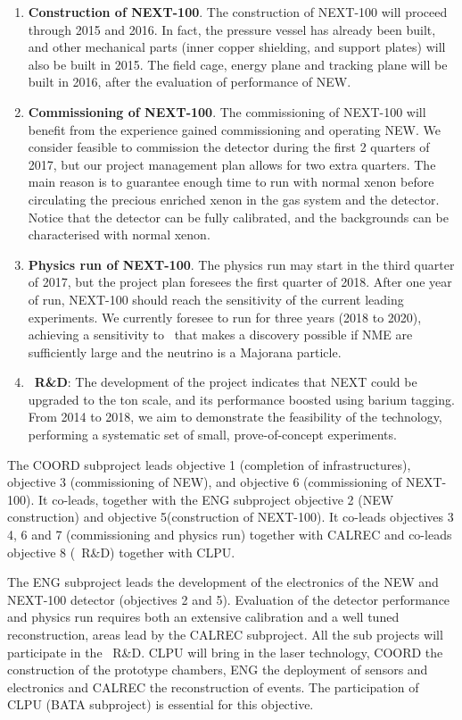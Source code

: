 \begin{enumerate}
\item {\bf Construction of NEXT-100}. The construction of NEXT-100 will proceed through 2015 and 2016. In fact, the pressure vessel has already been built, and other mechanical parts (inner copper shielding, and support plates) will also be built in 2015. The field cage, energy plane and tracking plane will be built in 2016, after the evaluation of performance of NEW. 

\item {\bf Commissioning of NEXT-100}. The commissioning of NEXT-100 will benefit from the experience gained commissioning and operating NEW. We consider feasible to commission the detector during the first 2 quarters of 2017, but our project management plan allows for two extra quarters. The main reason is to guarantee enough time to run with normal xenon before circulating the precious enriched xenon in the gas system and the detector. Notice that the detector can be fully calibrated, and the backgrounds can be characterised with normal xenon.  

\item {\bf Physics run of NEXT-100}. The physics run may start in the third quarter of 2017, but the project plan foresees the first quarter of 2018. After one year of run, NEXT-100 should reach the sensitivity of the current leading experiments. We currently foresee to run for three years (2018 to 2020), achieving a sensitivity to \mbb\ that makes a discovery possible if NME are sufficiently large and the neutrino is a Majorana particle. 

\item { \BATA\ \bf R\&D}: The development of the project indicates that NEXT could be upgraded to the ton scale, and its performance boosted using barium tagging. From 2014 to 2018, we aim to demonstrate the feasibility of the technology, performing a systematic set of small, prove-of-concept experiments. 
\end{enumerate}

The COORD subproject leads objective 1 (completion of infrastructures),
objective 3 (commissioning of NEW), and objective 6 (commissioning of NEXT-100). It co-leads, together with the ENG subproject objective 2 (NEW construction) and objective 5(construction of NEXT-100). It co-leads objectives 3 4, 6 and 7 (commissioning and physics run) together with CALREC and co-leads objective 8 (\BATA\ R\&D) together with CLPU.

The ENG subproject leads the development of the electronics of the NEW and NEXT-100 detector (objectives 2 and 5). Evaluation of the detector performance and physics run requires both an extensive calibration and a well tuned reconstruction, areas lead by the CALREC subproject. All the sub projects will participate in the \BATA\ R\&D. CLPU will bring in the laser technology, COORD the construction of the prototype chambers, ENG the deployment of sensors and electronics and CALREC the reconstruction of events. The participation of CLPU (BATA subproject) is essential for this objective.

